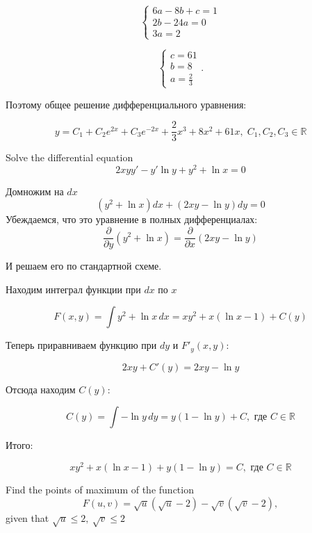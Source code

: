 \documentclass[addpoints, answers]{exam} %
\newcommand{\RR}{\mathbb{R}}
\begin{document}
\begin{questions}
\begin{solution}
  \[\left\{\begin{array}{l} {6a-8b+c=1} \\ {2b-24a=0} \\ {3a=2} \end{array}\right. \]

  \[\left\{\begin{array}{l} {c=61} \\ {b=8} \\ {a=\frac{2}{3} } \end{array}\right. .\]

  Поэтому общее решение дифференциального уравнения:

  \[y=C_{1} +C_{2} e^{2x} +C_{3} e^{-2x} +\frac{2}{3} x^{3} +8x^{2} +61x,\; C_{1} ,C_{2} ,C_{3} \in \RR \]

\end{solution}



\question[10] Solve the differential equation
\[
2xyy' - y' \ln y + y^2 + \ln x =0
\]
\begin{solution}
Домножим на $dx$
\[
(y^2+\ln x)dx + (2xy - \ln y)dy=0
\]
Убеждаемся, что это уравнение в полных дифференциалах:
\[
\frac{\partial}{\partial y}(y^2+\ln x)=\frac{\partial}{\partial x}(2xy - \ln y)
\]

И решаем его по стандартной схеме.

Находим интеграл функции при $dx$ по $x$

\[
F(x,y)=\int  y^2+\ln x \, dx = xy^2 + x(\ln x - 1) + C(y)
\]

Теперь приравниваем функцию при $dy$  и $F'_y(x,y)$:

\[
2xy + C'(y)=2xy - \ln y
\]

Отсюда находим $C(y)$:

\[
C(y)=\int -\ln y \, dy = y(1-\ln y) + C, \text{ где } C\in \RR
\]

Итого:

\[
xy^2+x(\ln x - 1) + y(1-\ln y)=C, \text{ где } C\in \RR
\]


\end{solution}





\question[10] Find the points of maximum of the function
\[
F\left(u,v\right)=\sqrt{u}\left(\sqrt{u}-2\right)-\sqrt{v}\left(\sqrt{v}-2\right),
\]
given that  $\sqrt{u}\le 2,\ \sqrt{v}\le 2$



\end{questions}
\end{document}
